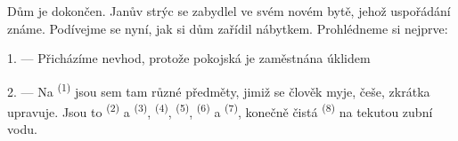 %
%
%

\VUsaut{6.0mm}
\VUsaut{1.4mm}
\VUsaut{0.4mm}
\VUsaut{2.2mm}

Dům je dokončen. Janův strýc se zabydlel ve svém novém bytě, jehož uspořádání známe. Podívejme
se nyní, jak si dům zařídil nábytkem. Prohlédneme si nejprve:

\VUsaut{3.0mm}

1. --- Přicházíme nevhod, protože pokojská je zaměstnána úklidem 

2. --- Na  \textsuperscript{(1)} jsou sem tam různé předměty, jimiž
se člověk myje, češe, zkrátka upravuje. Jsou to  \textsuperscript{(2)} a
 \textsuperscript{(3)},  \textsuperscript{(4)},
 \textsuperscript{(5)},
 \textsuperscript{(6)} a  \textsuperscript{(7)}, konečně
čistá  \textsuperscript{(8)} na tekutou zubní vodu.

